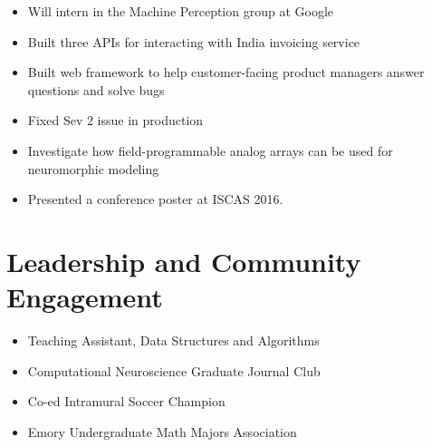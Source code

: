 \documentclass[letterpaper]{deedy-resume} %
\begin{document}
\begin{minipage}[t]{0.66\textwidth}
\begin{itemize}
	\item{Will intern in the Machine Perception group at Google}
\end{itemize}

\vspace{2mm}

\begin{itemize}
	\item{Built three APIs for interacting with India invoicing service}
	\item{Built web framework to help customer-facing product managers answer questions and solve bugs}
	\item{Fixed Sev 2 issue in production}
\end{itemize}

\vspace{2mm}

\begin{itemize}
	\item{Investigate how field-programmable analog arrays can be used for neuromorphic modeling}
	\item{Presented a conference poster at ISCAS 2016.}
\end{itemize}

\sectionspace %


\section{Leadership and Community Engagement}

\sectionspace

\begin{itemize}
	\item{Teaching Assistant, Data Structures and Algorithms}
	\item{Computational Neuroscience Graduate Journal Club}
	\item{Co-ed Intramural Soccer Champion}
	\item{Emory Undergraduate Math Majors Association}
\end{itemize}


\end{minipage}
\end{document}
